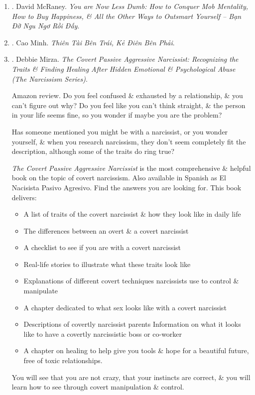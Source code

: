 \documentclass{article}
\begin{document}
\begin{enumerate}
	\item \cite{McRaney_less_stupid_VN}. {\sc David McRaney}. {\it You are Now Less Dumb: How to Conquer Mob Mentality, How to Buy Happiness, \& All the Other Ways to Outsmart Yourself -- Bạn Đỡ Ngu Ngơ Rồi Đấy}.\hfill{\sf[done]}
	
	\item \cite{Minh2022}. Cao Minh. {\it Thiên Tài Bên Trái, Kẻ Điên Bên Phải}.\hfill{\sf[done]}
	
	\item \cite{Mirza_covert_passive_aggressive_narcissist}. {\sc Debbie Mirza}. {\it The Covert Passive Aggressive Narcissist: Recognizing the Traits \& Finding Healing After Hidden Emotional \& Psychological Abuse (The Narcissism Series)}. {}\hfill{\sf[done]}
	
	{\sf Amazon review.} Do you feel confused \& exhausted by a relationship, \& you can't figure out why? Do you feel like you can't think straight, \& the person in your life seems fine, so you wonder if maybe you are the problem?
	
	Has someone mentioned you might be with a narcissist, or you wonder yourself, \& when you research narcissism, they don't seem completely fit the description, although some of the traits do ring true?
	
	{\it The Covert Passive Aggressive Narcissist} is the most comprehensive \& helpful book on the topic of covert narcissism. Also available in Spanish as El Nacisista Pasivo Agresivo. Find the answers you are looking for. This book delivers:
	\begin{itemize}
		\item A list of traits of the covert narcissist \& how they look like in daily life
		\item The differences between an overt \& a covert narcissist
		\item A checklist to see if you are with a covert narcissist
		\item Real-life stories to illustrate what these traits look like
		\item Explanations of different covert techniques narcissists use to control \& manipulate
		\item A chapter dedicated to what sex looks like with a covert narcissist
		\item Descriptions of covertly narcissist parents Information on what it looks like to have a covertly narcissistic boss or co-worker
		\item A chapter on healing to help give you tools \& hope for a beautiful future, free of toxic relationships.
	\end{itemize}
	You will see that you are not crazy, that your instincts are correct, \& you will learn how to see through covert manipulation \& control.
	

\end{enumerate}
\end{document}

